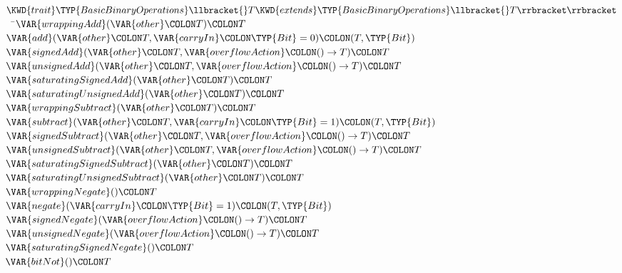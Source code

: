 \begin{Fortress}
\(\KWD{trait} \TYP{BasicBinaryOperations}\llbracket{}T \KWD{extends} \TYP{BasicBinaryOperations}\llbracket{}T\rrbracket\rrbracket\)\\
{\tt~~}\pushtabs\=\+\(  \VAR{wrappingAdd}(\VAR{other}\COLON T)\COLON T\)\\
\(  \VAR{add}(\VAR{other}\COLON T, \VAR{carryIn}\COLON \TYP{Bit}=0)\COLON (T,\TYP{Bit})\)\\
\(  \VAR{signedAdd}(\VAR{other}\COLON T, \VAR{overflowAction}\COLON ()\rightarrow{}T)\COLON T\)\\
\(  \VAR{unsignedAdd}(\VAR{other}\COLON T, \VAR{overflowAction}\COLON ()\rightarrow{}T)\COLON T\)\\
\(  \VAR{saturatingSignedAdd}(\VAR{other}\COLON T)\COLON T\)\\
\(  \VAR{saturatingUnsignedAdd}(\VAR{other}\COLON T)\COLON T\)\\
\(  \VAR{wrappingSubtract}(\VAR{other}\COLON T)\COLON T\)\\
\(  \VAR{subtract}(\VAR{other}\COLON T, \VAR{carryIn}\COLON \TYP{Bit}=1)\COLON (T,\TYP{Bit})\)\\
\(  \VAR{signedSubtract}(\VAR{other}\COLON T, \VAR{overflowAction}\COLON ()\rightarrow{}T)\COLON T\)\\
\(  \VAR{unsignedSubtract}(\VAR{other}\COLON T, \VAR{overflowAction}\COLON ()\rightarrow{}T)\COLON T\)\\
\(  \VAR{saturatingSignedSubtract}(\VAR{other}\COLON T)\COLON T\)\\
\(  \VAR{saturatingUnsignedSubtract}(\VAR{other}\COLON T)\COLON T\)\\
\(  \VAR{wrappingNegate}()\COLON T\)\\
\(  \VAR{negate}(\VAR{carryIn}\COLON \TYP{Bit}=1)\COLON (T,\TYP{Bit})\)\\
\(  \VAR{signedNegate}(\VAR{overflowAction}\COLON ()\rightarrow{}T)\COLON T\)\\
\(  \VAR{unsignedNegate}(\VAR{overflowAction}\COLON ()\rightarrow{}T)\COLON T\)\\
\(  \VAR{saturatingSignedNegate}()\COLON T\)\\
\(  \VAR{bitNot}()\COLON T\)\\

\end{Fortress}

